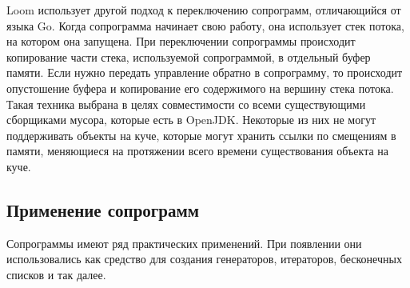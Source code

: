 	\par
	Loom использует другой подход к переключению сопрограмм, отличающийся от языка Go. Когда сопрограмма начинает
	свою работу, она использует стек потока, на котором она запущена. При переключении сопрограммы происходит
	копирование части стека, используемой сопрограммой, в отдельный буфер памяти. Если нужно передать 
	управление обратно в сопрограмму, то происходит опустошение буфера и копирование его содержимого на 
	вершину стека потока\cite{loom-main}. Такая техника выбрана в целях совместимости со всеми существующими 
	сборщиками мусора, которые есть в OpenJDK. Некоторые из них не могут поддерживать объекты на куче, которые
	могут хранить ссылки по смещениям в памяти, меняющиеся на протяжении всего времени существования объекта
	на куче.

	\subsection{Применение сопрограмм}
	Сопрограммы имеют ряд практических применений. При появлении они использовались как средство
	для создания генераторов, итераторов, бесконечных списков и так далее. 
	
